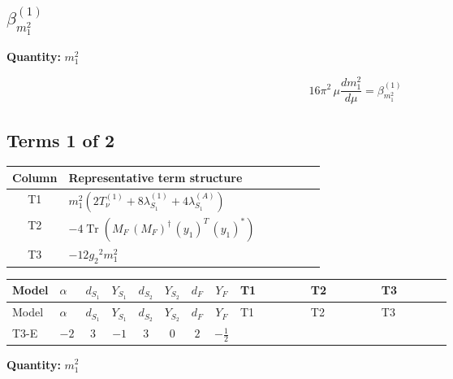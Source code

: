 \documentclass[8pt]{article}
\begin{document}
\begin{landscape}
\section*{$\beta_{m_1^2}^{(1)}$}
\noindent\textbf{Quantity: }$m_1^2$\par\smallskip
\[16\pi^2\,\mu\frac{d m_1^2}{d\mu}=\beta_{m_1^2}^{(1)}\]
\subsection*{Terms 1 of 2}
\begin{center}
\begin{tabular}{@{}c >{\raggedright\arraybackslash}p{0.82\linewidth}@{}}
\toprule
Column & Representative term structure \\
\midrule
T1 & \(\displaystyle {m_1^2} (2 T_{\nu}^{(1)}+8 {\lambda_{S_1}^{(1)}}+4 {\lambda_{S_1}^{(A)}})\) \\
\midrule
T2 & \(\displaystyle -4 \operatorname{Tr}\!\left({M_F}\,\left({M_F}\right)^{\dagger}\,\left({y_1}\right)^{T}\,\left({y_1}\right)^{*}\right)\) \\
\midrule
T3 & \(\displaystyle -12 {g_2}^2 {m_1^2}\) \\
\midrule
\bottomrule
\end{tabular}
\end{center}
\smallskip
\tiny
\begin{longtable}{@{}llcccccc >{\raggedright\arraybackslash}p{0.21\linewidth} >{\raggedright\arraybackslash}p{0.21\linewidth} >{\raggedright\arraybackslash}p{0.21\linewidth}@{}}
\toprule
Model & $\alpha$ & $d_{S_1}$ & $Y_{S_1}$ & $d_{S_2}$ & $Y_{S_2}$ & $d_F$ & $Y_F$ & T1 & T2 & T3 \\
\midrule
\endfirsthead
\toprule
Model & $\alpha$ & $d_{S_1}$ & $Y_{S_1}$ & $d_{S_2}$ & $Y_{S_2}$ & $d_F$ & $Y_F$ & T1 & T2 & T3 \\
\midrule
\endhead
T3-E & $-2$ & $3$ & $-1$ & $3$ & $0$ & $2$ & $-\frac{1}{2}$ & \scriptsize\adjustbox{max width=\linewidth}{$\begin{gathered} {m_1^2} (2 T_{\nu}^{(1)}+8 {\lambda_{S_1}^{(1)}}+4 {\lambda_{S_1}^{(A)}})\end{gathered}$} & \scriptsize\adjustbox{max width=\linewidth}{$\begin{gathered} -4 \operatorname{Tr}\!\left({M_F}\,\left({M_F}\right)^{\dagger}\,\left({y_1}\right)^{T}\,\left({y_1}\right)^{*}\right)\end{gathered}$} & \scriptsize\adjustbox{max width=\linewidth}{$\begin{gathered} -12 {g_2}^2 {m_1^2}\end{gathered}$} \\
\midrule
\bottomrule
\end{longtable}
\clearpage
\noindent\textbf{Quantity: }$m_1^2$\par\smallskip

\end{landscape}
\end{document}
